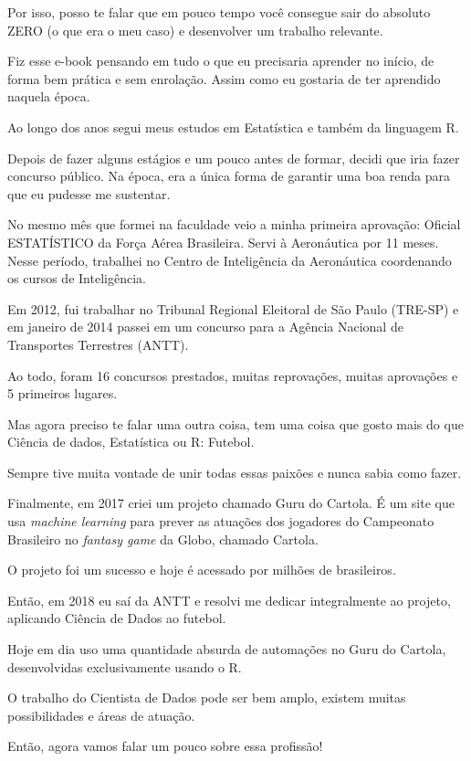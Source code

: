 \documentclass[
]{book}
\begin{document}
Por isso, posso te falar que em pouco tempo você consegue sair do
absoluto ZERO (o que era o meu caso) e desenvolver um trabalho
relevante.

Fiz esse e-book pensando em tudo o que eu precisaria aprender no início,
de forma bem prática e sem enrolação. Assim como eu gostaria de ter
aprendido naquela época.

Ao longo dos anos segui meus estudos em Estatística e também da
linguagem R.

Depois de fazer alguns estágios e um pouco antes de formar, decidi que
iria fazer concurso público. Na época, era a única forma de garantir uma
boa renda para que eu pudesse me sustentar.

No mesmo mês que formei na faculdade veio a minha primeira aprovação:
Oficial ESTATÍSTICO da Força Aérea Brasileira. Servi à Aeronáutica por
11 meses. Nesse período, trabalhei no Centro de Inteligência da
Aeronáutica coordenando os cursos de Inteligência.

Em 2012, fui trabalhar no Tribunal Regional Eleitoral de São Paulo
(TRE-SP) e em janeiro de 2014 passei em um concurso para a Agência
Nacional de Transportes Terrestres (ANTT).

Ao todo, foram 16 concursos prestados, muitas reprovações, muitas
aprovações e 5 primeiros lugares.

Mas agora preciso te falar uma outra coisa, tem uma coisa que gosto mais
do que Ciência de dados, Estatística ou R: Futebol.

Sempre tive muita vontade de unir todas essas paixões e nunca sabia como
fazer.

Finalmente, em 2017 criei um projeto chamado Guru do Cartola. É um site
que usa \emph{machine learning} para prever as atuações dos jogadores do
Campeonato Brasileiro no \emph{fantasy game} da Globo, chamado Cartola.

O projeto foi um sucesso e hoje é acessado por milhões de brasileiros.

Então, em 2018 eu saí da ANTT e resolvi me dedicar integralmente ao
projeto, aplicando Ciência de Dados ao futebol.

Hoje em dia uso uma quantidade absurda de automações no Guru do Cartola,
desenvolvidas exclusivamente usando o R.

O trabalho do Cientista de Dados pode ser bem amplo, existem muitas
possibilidades e áreas de atuação.

Então, agora vamos falar um pouco sobre essa profissão!
\end{document}
